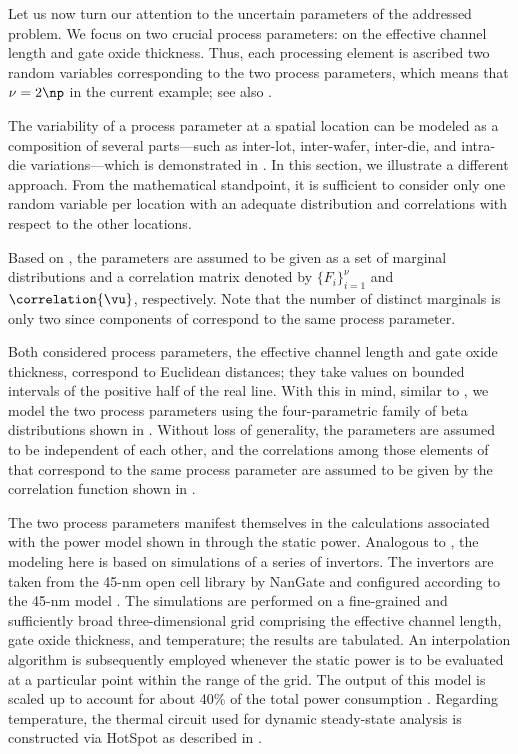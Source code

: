 Let us now turn our attention to the uncertain parameters \vu of the addressed
problem. We focus on two crucial process parameters: on the effective channel
length and gate oxide thickness. Thus, each processing element is ascribed two
random variables corresponding to the two process parameters, which means that
$\nu = 2 \np$ in the current example; see also .

\begin{remark}
The variability of a process parameter at a spatial location can be modeled as a
composition of several parts---such as inter-lot, inter-wafer, inter-die, and
intra-die variations---which is demonstrated in
. In this section, we illustrate a different
approach. From the mathematical standpoint, it is sufficient to consider only
one random variable per location with an adequate distribution and correlations
with respect to the other locations.
\end{remark}

Based on , the parameters \vu are assumed to be given as
a set of marginal distributions and a correlation matrix denoted by $\{ F_i
\}_{i = 1}^\nu$ and $\correlation{\vu}$, respectively. Note that the number of
distinct marginals is only two since \np components of \vu correspond to the
same process parameter.

Both considered process parameters, the effective channel length and gate oxide
thickness, correspond to Euclidean distances; they take values on bounded
intervals of the positive half of the real line. With this in mind, similar to
, we model the two process parameters using
the four-parametric family of beta distributions shown in
. Without loss of generality, the parameters are assumed
to be independent of each other, and the correlations among those elements of
\vu that correspond to the same process parameter are assumed to be given by the
correlation function shown in .

The two process parameters manifest themselves in the calculations associated
with the power model shown in  through the static
power. Analogous to , the modeling here is
based on  simulations of a series of  invertors. The
invertors are taken from the 45-nm open cell library by NanGate \cite{nangate}
and configured according to the 45-nm   model \cite{ptm}. The
simulations are performed on a fine-grained and sufficiently broad
three-dimensional grid comprising the effective channel length, gate oxide
thickness, and temperature; the results are tabulated. An interpolation
algorithm is subsequently employed whenever the static power is to be evaluated
at a particular point within the range of the grid. The output of this model is
scaled up to account for about 40\% of the total power consumption
\cite{liu2007}. Regarding temperature, the thermal  circuit used for
dynamic steady-state analysis is constructed via HotSpot \cite{skadron2003} as
described in .

